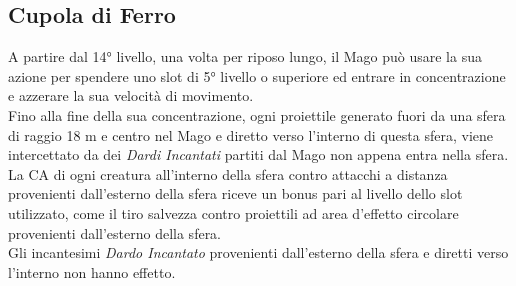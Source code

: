 \subsection{Cupola di Ferro}
A partire dal 14° livello, una volta per riposo lungo, il Mago può usare la sua azione per spendere uno slot di 5° livello o superiore ed entrare in concentrazione e azzerare la sua velocità di movimento. \\ Fino alla fine della sua concentrazione, ogni proiettile generato fuori da una sfera di raggio 18 m e centro nel Mago e diretto verso l'interno di questa sfera, viene intercettato da dei \textit{Dardi Incantati} partiti dal Mago non appena entra nella sfera. \\ La CA di ogni creatura all'interno della sfera contro attacchi a distanza provenienti dall'esterno della sfera riceve un bonus pari al livello dello slot utilizzato, come il tiro salvezza contro proiettili ad area d'effetto circolare provenienti dall'esterno della sfera. \\ Gli incantesimi \textit{Dardo Incantato} provenienti dall'esterno della sfera e diretti verso l'interno non hanno effetto.
